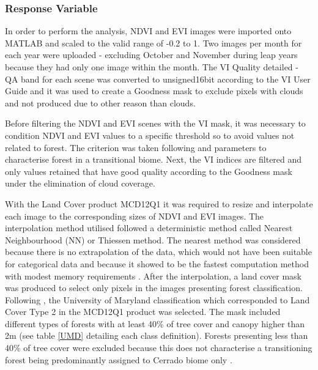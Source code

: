\subsubsection{Response Variable}  %


In order to perform the analysis, NDVI and EVI images were imported onto MATLAB and scaled to the valid range of -0.2 to 1. Two images per month for each year were uploaded - excluding October and November during leap years because they had only one image within the month. The VI Quality detailed - QA band for each scene was converted to unsigned16bit according to the VI User Guide \citep{didan_munoz_2015} and it was used to create a Goodness mask to exclude pixels with clouds and not produced due to other reason than clouds. 

Before filtering the NDVI and EVI scenes with the VI mask, it was necessary to condition NDVI and EVI values to a specific threshold so to avoid values not related to forest. The criterion was taken following \citet{geerken_2009} and \citet{bayma_sano_2015} parameters to characterise forest in a transitional biome. Next, the VI indices are filtered and only values retained that have good quality according to the Goodness mask under the elimination of cloud coverage. 

With the Land Cover product MCD12Q1 it was required to resize and interpolate each image to the corresponding sizes of NDVI and EVI images. The interpolation method utilised followed a deterministic method called Nearest Neighbourhood (NN) or Thiessen method. The nearest method was considered because there is no extrapolation of the data, which would not have been suitable for categorical data and because it showed to be the fastest computation method with modest memory requirements \citep{ SLUITER_2009, matlab_2017}. After the interpolation, a land cover mask was produced to select only pixels in the images presenting forest classification. Following \citet{sulla2_2018}, the University of Maryland classification which corresponded to Land Cover Type 2 in the MCD12Q1 product was selected. The mask included different types of forests with at least 40\% of tree cover and canopy higher than 2m (see table \ref{UMD} detailing each class definition). Forests presenting less than 40\% of tree cover were excluded because this does not characterise a transitioning forest being predominantly assigned to Cerrado biome only \citep{bayma_sano_2015}.  

